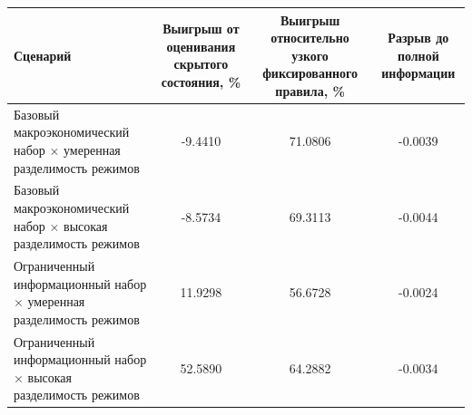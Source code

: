 \begin{tabular}{lccc}
\toprule
Сценарий & Выигрыш от оценивания скрытого состояния, \% & Выигрыш относительно узкого фиксированного правила, \% & Разрыв до полной информации \\
\midrule
Базовый макроэкономический набор × умеренная разделимость режимов & -9.4410 & 71.0806 & -0.0039 \\
Базовый макроэкономический набор × высокая разделимость режимов & -8.5734 & 69.3113 & -0.0044 \\
Ограниченный информационный набор × умеренная разделимость режимов & 11.9298 & 56.6728 & -0.0024 \\
Ограниченный информационный набор × высокая разделимость режимов & 52.5890 & 64.2882 & -0.0034 \\
\bottomrule
\end{tabular}
